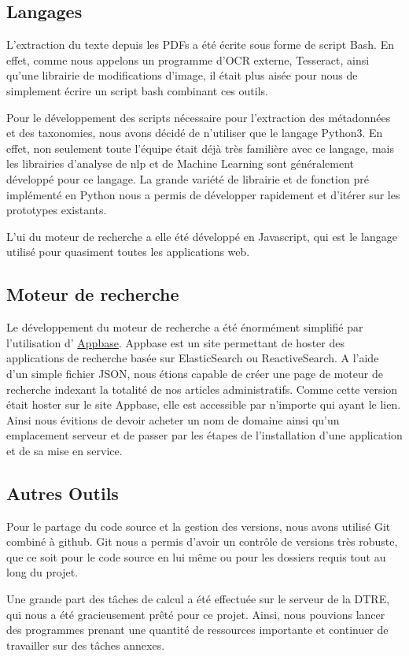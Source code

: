 
\subsection{Langages}
L'extraction du texte depuis les PDFs a été écrite sous forme de script Bash. En effet, comme nous appelons un programme d'OCR externe, Tesseract, ainsi qu'une librairie de modifications d'image, il était plus aisée pour nous de simplement écrire un script bash combinant ces outils.

Pour le développement des scripts nécessaire pour l'extraction des métadonnées et des taxonomies, nous avons décidé de n'utiliser que le langage Python3. En effet, non seulement toute l'équipe était déjà très familière avec ce langage, mais les librairies d'analyse de \gls{nlp} et de Machine Learning sont généralement développé pour ce langage. La grande variété de librairie et de fonction pré implémenté en Python nous a permis de développer rapidement et d'itérer sur les prototypes existants. 

L'\gls{ui} du moteur de recherche a elle été développé en Javascript, qui est le langage utilisé pour quasiment toutes les applications web. 

\subsection{Moteur de recherche}
Le développement du moteur de recherche a été énormément simplifié par l'utilisation d' \href{https://appbase.io}{Appbase}. Appbase est un site permettant de hoster des applications de recherche basée sur ElasticSearch ou ReactiveSearch. A l'aide d'un simple fichier JSON, nous étions capable de créer une page de moteur de recherche indexant la totalité de nos articles administratifs. Comme cette version était hoster sur le site Appbase, elle est accessible par n'importe qui ayant le lien. Ainsi nous évitions de devoir acheter un nom de domaine ainsi qu'un emplacement serveur et de passer par les étapes de l'installation d'une application et de sa mise en service. 

\subsection{Autres Outils}
Pour le partage du code source et la gestion des versions, nous avons utilisé Git combiné à github. Git nous a permis d'avoir un contrôle de versions très robuste, que ce soit pour le code source en lui même ou pour les dossiers requis tout au long du projet. 

Une grande part des tâches de calcul a été effectuée sur le serveur de la DTRE, qui nous a été gracieusement prêté pour ce projet. Ainsi, nous pouvions lancer des programmes prenant une quantité de ressources importante et continuer de travailler sur des tâches annexes.



